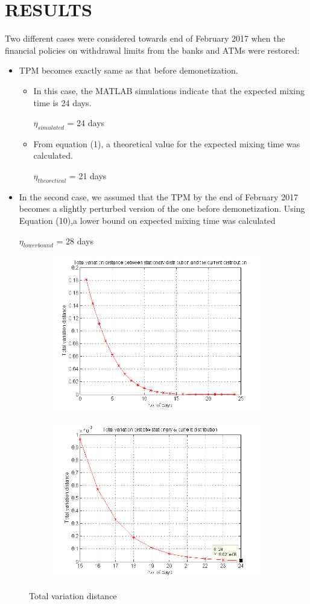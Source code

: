 \documentclass[12pt]{article}
\begin{document}
\section{RESULTS}

Two different cases were considered towards end of February 2017 when the financial policies on withdrawal limits from the banks and ATMs were restored:

\begin{itemize}
\item TPM becomes exactly same as that before demonetization.
\begin{itemize}
\item In this case, the MATLAB simulations indicate that the expected mixing time is 24 days.
\begin{center}
$\eta_{simulated}$ = 24 days
\end{center}
\item From equation (1), a theoretical value for the expected mixing time was calculated.
\begin{center}
$\eta_{theoretical}$ = 21 days
\end{center}


\end{itemize}
\item In the second case, we assumed that the TPM by the end of February 2017 becomes a slightly perturbed version of the one before demonetization. Using Equation (10),a lower bound on expected mixing time was calculated
\begin{center}
$\eta_{lower bound}$ = 28 days
\end{center}
\end{itemize}
\begin{figure}[H]
\centering
\begin{subfigure}
  \centering
  \includegraphics[width=.4\linewidth]{TVD1.png}
\end{subfigure}
\begin{subfigure}
  \centering
  \includegraphics[width=.4\linewidth]{TVD2.png}
\end{subfigure}
\caption{Total variation distance}
\label{fig:test}
\end{figure}
\end{document}
